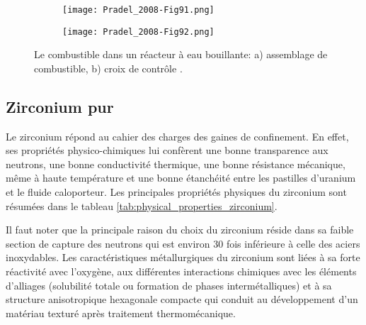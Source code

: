 \begin{refsection}
    \begin{figure}[H] 
 		\centering 
 		\begin{subfigure}[b]{0.45\textwidth}
 		    \texttt{[image: Pradel\_2008-Fig91.png]}
 		    \caption{}
 		    \label{subfig:BWR_fuel_assembly}
 		\end{subfigure}
 		\quad \quad \quad
		\begin{subfigure}[b]{0.45\textwidth}
 		    \texttt{[image: Pradel\_2008-Fig92.png]}
 		    \caption{}
 		    \label{subfig:COntrol_Blades}
 		\end{subfigure}
		\caption[Le combustible dans un réacteur à eau bouillante:
        a) assemblage de combustible,
        b) croix de contrôle.]{Le combustible dans un réacteur à eau bouillante:
        a) assemblage de combustible,
        b) croix de contrôle \citep{Pradel2008}.} 
 		\label{fig:Assembly_Control_Blades} 
 	\end{figure}
    \newpage

    
    
	 	
    \subsection{Zirconium pur}\label{subsec:Zirconium}

    Le zirconium répond au cahier des charges des gaines de confinement. En effet,
    ses propriétés physico-chimiques lui confèrent une bonne transparence aux
    neutrons, une bonne conductivité thermique, une bonne résistance mécanique, même
    à haute température et une bonne étanchéité entre les pastilles d'uranium et le fluide caloporteur.
    Les principales propriétés physiques du zirconium sont résumées dans le tableau \ref{tab:physical_properties_zirconium}. 

    Il faut noter que la principale raison du choix du zirconium réside dans sa
    faible section de capture des neutrons qui est environ 30 fois inférieure à celle
    des aciers inoxydables. Les caractéristiques
    métallurgiques du zirconium sont liées à sa forte réactivité avec l’oxygène, aux
    différentes interactions chimiques avec les éléments d’alliages (solubilité
    totale ou formation de phases intermétalliques) et à sa structure anisotropique
    hexagonale compacte qui conduit au développement d'un matériau texturé après
    traitement thermomécanique. 



\end{refsection}
